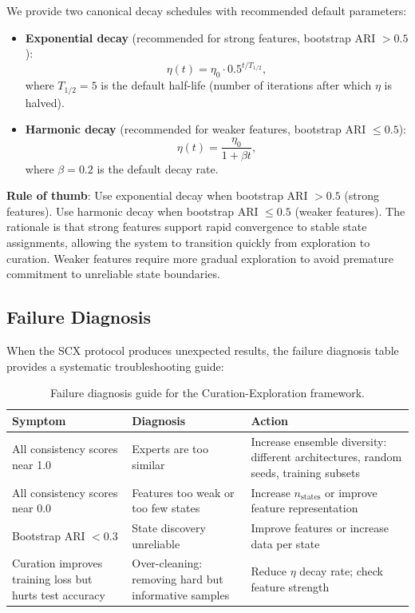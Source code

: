\documentclass{article}
\begin{document}
We provide two canonical decay schedules with recommended default parameters:

\begin{itemize}
    \item \textbf{Exponential decay} (recommended for strong features, bootstrap ARI $> 0.5$):
    \[
    \eta(t) = \eta_0 \cdot 0.5^{t / T_{1/2}},
    \]
    where $T_{1/2} = 5$ is the default half-life (number of iterations after which $\eta$ is halved).

    \item \textbf{Harmonic decay} (recommended for weaker features, bootstrap ARI $\leq 0.5$):
    \[
    \eta(t) = \frac{\eta_0}{1 + \beta t},
    \]
    where $\beta = 0.2$ is the default decay rate.
\end{itemize}

\textbf{Rule of thumb}: Use exponential decay when bootstrap ARI $> 0.5$ (strong features). Use harmonic decay when bootstrap ARI $\leq 0.5$ (weaker features). The rationale is that strong features support rapid convergence to stable state assignments, allowing the system to transition quickly from exploration to curation. Weaker features require more gradual exploration to avoid premature commitment to unreliable state boundaries.

\subsection{Failure Diagnosis}
\label{sec:diagnosis}

When the SCX protocol produces unexpected results, the failure diagnosis table provides a systematic troubleshooting guide:

\begin{table}[t]
\centering
\caption{Failure diagnosis guide for the Curation-Exploration framework.}
\label{tab:diagnosis}
\begin{tabular}{p{3.2cm}p{4cm}p{4.5cm}}
\toprule
Symptom & Diagnosis & Action \\
\midrule
All consistency scores near 1.0 & Experts are too similar & Increase ensemble diversity: different architectures, random seeds, training subsets \\
All consistency scores near 0.0 & Features too weak or too few states & Increase $n_{\text{states}}$ or improve feature representation \\
Bootstrap ARI $< 0.3$ & State discovery unreliable & Improve features or increase data per state \\
Curation improves training loss but hurts test accuracy & Over-cleaning: removing hard but informative samples & Reduce $\eta$ decay rate; check feature strength \\
\bottomrule
\end{tabular}
\end{table}
\end{document}
